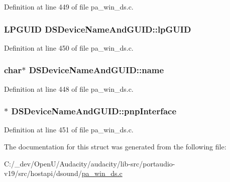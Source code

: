 Definition at line 449 of file pa\+\_\+win\+\_\+ds.\+c.

\subsubsection[{\texorpdfstring{lp\+G\+U\+ID}{lpGUID}}]{\setlength{\rightskip}{0pt plus 5cm}L\+P\+G\+U\+ID D\+S\+Device\+Name\+And\+G\+U\+I\+D\+::lp\+G\+U\+ID}\hypertarget{struct_d_s_device_name_and_g_u_i_d_a5b90ed2e9ca64d8ceffd5d4f80bca259}{}\label{struct_d_s_device_name_and_g_u_i_d_a5b90ed2e9ca64d8ceffd5d4f80bca259}


Definition at line 450 of file pa\+\_\+win\+\_\+ds.\+c.

\subsubsection[{\texorpdfstring{name}{name}}]{\setlength{\rightskip}{0pt plus 5cm}char$\ast$ D\+S\+Device\+Name\+And\+G\+U\+I\+D\+::name}\hypertarget{struct_d_s_device_name_and_g_u_i_d_aa8ad5e45db7c8b3191cbc7a941f3319c}{}\label{struct_d_s_device_name_and_g_u_i_d_aa8ad5e45db7c8b3191cbc7a941f3319c}


Definition at line 448 of file pa\+\_\+win\+\_\+ds.\+c.

\subsubsection[{\texorpdfstring{pnp\+Interface}{pnpInterface}}]{$\ast$ D\+S\+Device\+Name\+And\+G\+U\+I\+D\+::pnp\+Interface}\hypertarget{struct_d_s_device_name_and_g_u_i_d_acda2e461898368f900fc852495b01c47}{}\label{struct_d_s_device_name_and_g_u_i_d_acda2e461898368f900fc852495b01c47}


Definition at line 451 of file pa\+\_\+win\+\_\+ds.\+c.



The documentation for this struct was generated from the following file\+:\begin{DoxyCompactItemize}
\item 
C\+:/\+\_\+dev/\+Open\+U/\+Audacity/audacity/lib-\/src/portaudio-\/v19/src/hostapi/dsound/\hyperlink{pa__win__ds_8c}{pa\+\_\+win\+\_\+ds.\+c}\end{DoxyCompactItemize}
